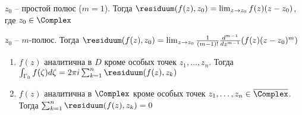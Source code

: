 \begin{enumerate}
    \begin{MyTheorem}
        \Ths $z_0$ -- простой полюс ($m = 1$). Тогда $\residuum(f(z), z_0) = \lim_{z \to z_0} f(z) (z - z_0)$, где $z_0 \in \Complex$
    \end{MyTheorem}
    
    \begin{MyTheorem}
        \Ths $z_0$ -- $m$-полюс. Тогда $\residuum(f(z), z_0) = \lim_{z \to z_0} \frac{1}{(m - 1)!} \frac{d^{m - 1}}{dz^{m - 1}} (f(z) (z - z_0)^m)$
    \end{MyTheorem}

    \begin{MyTheorem}
    
        \begin{enumerate}
            \item $f(z)$ аналитична в $D$ кроме особых точек $z_1, \dots, z_n$. Тогда $\int_{\Gamma_0} f(\zeta) d\zeta = 2\pi i \sum_{k = 1}^n \residuum(f(z), z_k)$
    
            \item $f(z)$ аналитична в $\Complex$ кроме особых точек $z_1, \dots, z_n \in \overline{\Complex}$. Тогда $\sum_{k = 1}^n \residuum(f(z), z_k) = 0$
        \end{enumerate}
    \end{MyTheorem}

\end{enumerate}
